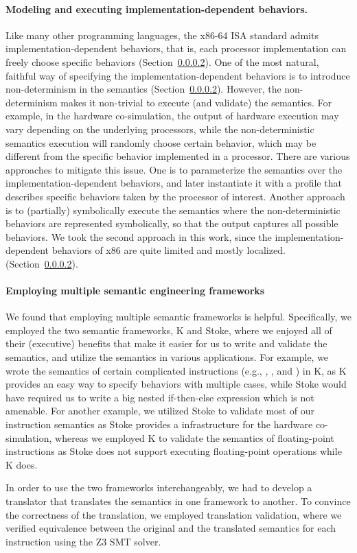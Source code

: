 \paragraph{Modeling and executing implementation-dependent behaviors.}

Like many other programming languages, the x86-64 ISA standard admits implementation-dependent behaviors, that is, each processor implementation can freely choose specific behaviors (Section~\ref{}). One of the most natural, faithful way of specifying the implementation-dependent behaviors is to introduce non-determinism in the semantics (Section~\ref{}). However, the non-determinism makes it non-trivial to execute (and validate) the semantics. For example, in the hardware co-simulation, the output of hardware execution may vary depending on the underlying processors, while the non-deterministic semantics execution will randomly choose certain behavior, which may be different from the specific behavior implemented in a processor. There are various approaches to mitigate this issue. One is to parameterize the semantics over the implementation-dependent behaviors, and later instantiate it with a profile that describes specific behaviors taken by the processor of interest. Another approach is to (partially) symbolically execute the semantics where the non-deterministic behaviors are represented symbolically, so that the output captures all possible behaviors. We took the second approach in this work, since the implementation-dependent behaviors of x86 are quite limited and mostly localized. (Section~\ref{}).

\paragraph{Employing multiple semantic engineering frameworks}

We found that employing multiple semantic frameworks is helpful. Specifically, we employed the two semantic frameworks, K and Stoke, where we enjoyed all of their (executive) benefits that make it easier for us to write and validate the semantics, and utilize the semantics in various applications. For example, we wrote the semantics of certain complicated instructions (e.g., , , and ) in K, as K provides an easy way to specify behaviors with multiple cases, while Stoke would have required us to write a big nested if-then-else expression which is not amenable. For another example, we utilized Stoke to validate most of our instruction semantics as Stoke provides a infrastructure for the hardware co-simulation, whereas we employed K to validate the semantics of floating-point instructions as Stoke does not support executing floating-point operations while K does.

In order to use the two frameworks interchangeably, we had to develop a translator that translates the semantics in one framework to another. To convince the correctness of the translation, we employed translation validation, where we verified equivalence between the original and the translated semantics for each instruction using the Z3 SMT solver.



